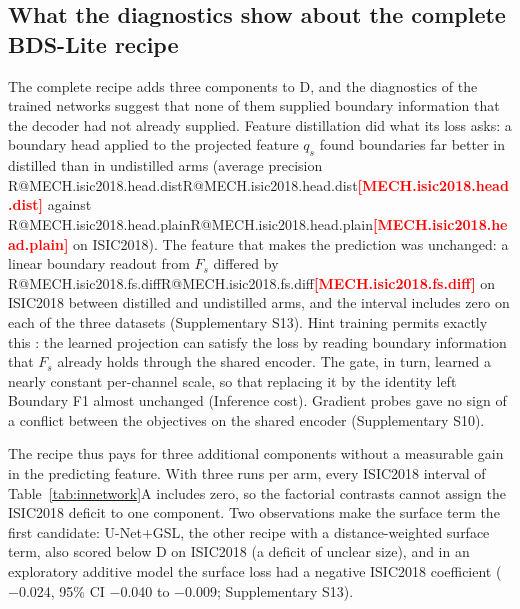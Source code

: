 \documentclass[fleqn,10pt,lineno]{wlpeerj}
\makeatletter
\newcommand{\R}[1]{\ifcsname R@#1\endcsname\csname R@#1\endcsname\else\textbf{\textcolor{red}{[#1]}}\fi}
\makeatother
\begin{document}
\subsection*{What the diagnostics show about the complete BDS-Lite recipe}
The complete recipe adds three components to D, and the diagnostics of the trained networks suggest that none of them supplied boundary information that the decoder had not already supplied. Feature distillation did what its loss asks: a boundary head applied to the projected feature $q_s$ found boundaries far better in distilled than in undistilled arms (average precision \R{MECH.isic2018.head.dist} against \R{MECH.isic2018.head.plain} on ISIC2018). The feature that makes the prediction was unchanged: a linear boundary readout from $F_s$ differed by \R{MECH.isic2018.fs.diff} on ISIC2018 between distilled and undistilled arms, and the interval includes zero on each of the three datasets (Supplementary S13). Hint training permits exactly this \citep{Romero2015FitNets}: the learned projection can satisfy the loss by reading boundary information that $F_s$ already holds through the shared encoder. The gate, in turn, learned a nearly constant per-channel scale, so that replacing it by the identity left Boundary F1 almost unchanged (Inference cost). Gradient probes gave no sign of a conflict between the objectives on the shared encoder (Supplementary S10).

The recipe thus pays for three additional components without a measurable gain in the predicting feature. With three runs per arm, every ISIC2018 interval of Table~\ref{tab:innetwork}A includes zero, so the factorial contrasts cannot assign the ISIC2018 deficit to one component. Two observations make the surface term the first candidate: U-Net+GSL, the other recipe with a distance-weighted surface term, also scored below D on ISIC2018 (a deficit of unclear size), and in an exploratory additive model the surface loss had a negative ISIC2018 coefficient ($-$0.024, 95\% CI $-$0.040 to $-$0.009; Supplementary S13).
\end{document}
